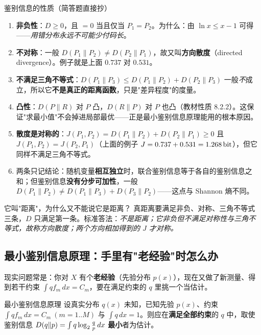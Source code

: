 \begin{defbox}{鉴别信息的性质（简答题直接抄）}
\begin{enumerate}[leftmargin=1.6em,itemsep=2pt,topsep=2pt]
\item \textbf{非负性}：$D\ge0$，且 $=0$ 当且仅当 $P_1=P_2$。为什么：由 $\ln x\le x-1$ 可得——\emph{用错分布永远不可能少付码长}。
\item \textbf{不对称}：一般 $D(P_1\|P_2)\ne D(P_2\|P_1)$，故又叫\textbf{方向散度}（directed divergence）。例子就是上面 $0.737$ 对 $0.531$。
\item \textbf{不满足三角不等式}：$D(P_1\|P_3)\le D(P_1\|P_2)+D(P_2\|P_3)$ 一般\emph{不}成立，所以它\textbf{不是真正的距离函数}，只是"差异程度"的度量。
\item \textbf{凸性}：$D(P\|R)$ 对 $P$ 凸，$D(R\|P)$ 对 $P$ 也凸（教材性质 8.2.2）。这保证"求最小值"不会掉进局部最优——正是最小鉴别信息原理能用的根本原因。
\item \textbf{散度是对称的}：$J(P_1,P_2)=D(P_1\|P_2)+D(P_2\|P_1)\ge0$ 且 $J(P_1,P_2)=J(P_2,P_1)$（上面的例子 $J=0.737+0.531=1.268\,\text{bit}$），但它同样不满足三角不等式。
\item 两条只记结论：随机变量\textbf{相互独立}时，联合鉴别信息等于各自的鉴别信息之和；但鉴别信息\textbf{没有分步可加性}，一般 $D(P_1\|P_2)\ne D(P_1\|P_3)+D(P_3\|P_2)$——这点与 Shannon 熵不同。
\end{enumerate}
\end{defbox}

\begin{qa}{它叫"距离"，为什么又不能说它是距离？}
真距离要满足非负、对称、三角不等式三条，$D$ 只满足第一条。标准答法：\emph{不是距离；它非负但不满足对称性与三角不等式，故称方向散度；两个方向相加得到的 $J$ 才对称。}
\end{qa}

\subsection{最小鉴别信息原理：手里有"老经验"时怎么办}

现实问题常是：你对 $X$ 有个\textbf{老经验}（先验分布 $p(x)$），现在又做了新测量、得到若干约束 $\int qf_m\,dx=C_m$，要在满足约束的 $q$ 里挑一个当估计。

\begin{defbox}{最小鉴别信息原理}
设真实分布 $q(x)$ 未知，已知先验 $p(x)$、约束 $\int qf_m\,dx=C_m\ (m=1..M)$ 与 $\int q\,dx=1$。则应在\textbf{满足全部约束}的 $q$ 中，取使鉴别信息 $D(q\|p)=\int q\log_{2}\frac{q}{p}\,dx$ \textbf{最小}者为估计。
\end{defbox}

